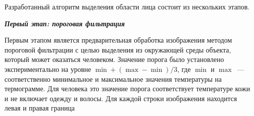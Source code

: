 \begin{multicols}{2}
  Разработанный алгоритм выделения области лица состоит из нескольких 
этапов.
  
  \medskip
  
  \noindent
  {\bfseries\textit{Первый этап: пороговая фильтрация}}
  \smallskip
  
  Первым этапом является предварительная обработка изображения методом 
пороговой фильтрации с целью выделения из окружающей среды объекта, 
который может оказаться человеком. Значение порога было установлено 
экспериментально на уровне $\min + (\max - \min)/3$, где $\min$ и $\max$~--- 
соответственно минимальное и максимальное значения температуры на термограмме. Для 
человека это значение порога соответствует температуре 
кожи и не включает одежду и волосы. Для каждой строки изображения находится 
левая и правая граница\linebreak\vspace*{-12pt}
\pagebreak

\end{multicols}

\begin{figure} %
  \vspace*{1pt}
\begin{center}
\mbox{%
\epsfxsize=159.968mm
}
\end{center}
\vspace*{-6pt}
\end{figure} 

\begin{figure} %
  \vspace*{3pt}
\begin{center}
\mbox{%
\epsfxsize=123.914mm
}
\end{center}
\vspace*{-6pt}
  \vspace*{3pt}
  \end{figure}

